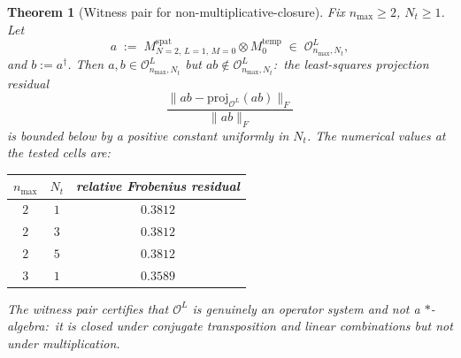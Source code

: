 \documentclass[11pt,a4paper]{article}
\theoremstyle{plain}
\newtheorem{theorem}{Theorem}[section]
\theoremstyle{definition}
\newcommand{\nmax}{n_{\max}}
\newcommand{\Nt}{N_t}
\newcommand{\Op}{\mathcal{O}}
\newcommand{\Frob}[1]{\lVert #1 \rVert_{F}}
\newcommand{\spat}{\mathrm{spat}}
\newcommand{\temp}{\mathrm{temp}}
\begin{document}
\begin{theorem}[Witness pair for non-multiplicative-closure]
\label{thm:witness_pair}
Fix $\nmax \ge 2$, $\Nt \ge 1$. Let
\begin{equation}\label{eq:witness_a}
   a \;:=\; M^{\spat}_{N=2,\, L=1,\, M=0} \otimes M_0^{\temp}
   \;\in\; \Op_{\nmax, \Nt}^L,
\end{equation}
and $b := a^\dagger$. Then $a, b \in \Op_{\nmax, \Nt}^L$ but
$ab \notin \Op_{\nmax, \Nt}^L$:\ the least-squares projection
residual
\[
   \frac{\Frob{ab - \mathrm{proj}_{\Op^L}(ab)}}{\Frob{ab}}
\]
is bounded below by a positive constant uniformly in $\Nt$. The
numerical values at the tested cells are:

\medskip
\begin{center}\renewcommand{\arraystretch}{1.20}
\begin{tabular}{c|c|c}
$\nmax$ & $\Nt$ & relative Frobenius residual \\
\hline
$2$ & $1$ & $0.3812$ \\
$2$ & $3$ & $0.3812$ \\
$2$ & $5$ & $0.3812$ \\
$3$ & $1$ & $0.3589$ \\
\end{tabular}
\end{center}
\medskip

\noindent
The witness pair certifies that $\Op^L$ is genuinely an operator
system and not a $*$-algebra:\ it is closed under conjugate
transposition and linear combinations but \emph{not} under
multiplication.
\end{theorem}
\end{document}

